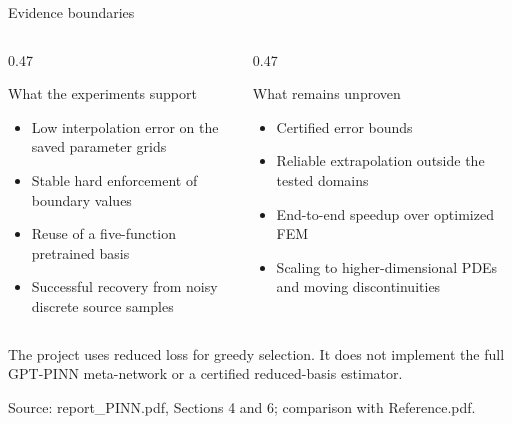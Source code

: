 \documentclass[aspectratio=169,xcolor=dvipsnames,11pt]{beamer}
\newcommand{\src}[1]{%
  \vfill
  {\color{MidGray}\fontsize{6.5}{7.5}\selectfont Source: #1\par}
}
\newcommand{\protocolnote}[1]{%
  {\color{MidGray}\scriptsize #1}
}
\begin{document}
\begin{frame}{Evidence boundaries}
  \begin{columns}[T,onlytextwidth]
    \begin{column}{0.47\textwidth}
      \begin{block}{What the experiments support}
        \begin{itemize}
          \item Low interpolation error on the saved parameter grids
          \item Stable hard enforcement of boundary values
          \item Reuse of a five-function pretrained basis
          \item Successful recovery from noisy discrete source samples
        \end{itemize}
      \end{block}
    \end{column}
    \begin{column}{0.47\textwidth}
      \begin{alertblock}{What remains unproven}
        \begin{itemize}
          \item Certified error bounds
          \item Reliable extrapolation outside the tested domains
          \item End-to-end speedup over optimized FEM
          \item Scaling to higher-dimensional PDEs and moving discontinuities
        \end{itemize}
      \end{alertblock}
    \end{column}
  \end{columns}
  \vspace{0.7em}
  \centering
  \protocolnote{The project uses reduced loss for greedy selection. It does not implement the full GPT-PINN meta-network or a certified reduced-basis estimator.}
  \src{report\_PINN.pdf, Sections 4 and 6; comparison with Reference.pdf.}
\end{frame}
\end{document}
